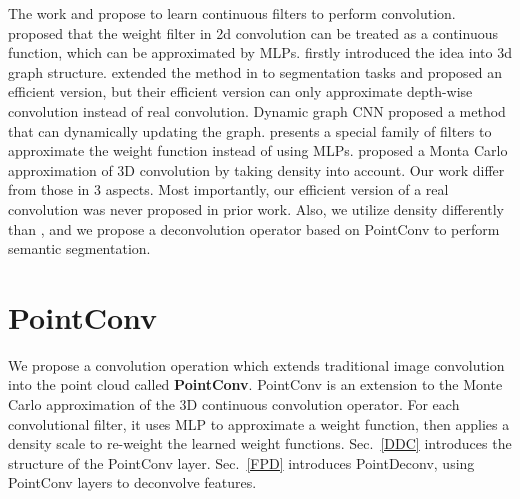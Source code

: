 \documentclass[10pt,twocolumn,letterpaper]{article}
\begin{document}
The work \cite{simonovsky2017dynamic,jia2016dynamic, wang2018dynamic, hermosilla2018monte, wang2018deep} and \cite{xu2018spidercnn} propose to learn continuous filters to perform convolution. \cite{jia2016dynamic} proposed that the weight filter in 2d convolution can be treated as a continuous function, which can be approximated by MLPs. \cite{simonovsky2017dynamic} firstly introduced the idea into 3d graph structure. \cite{wang2018deep} extended the method in \cite{simonovsky2017dynamic} to segmentation tasks and proposed an efficient version, but their efficient version can only approximate depth-wise convolution instead of real convolution. Dynamic graph CNN \cite{wang2018dynamic} proposed a method that can dynamically updating the graph. \cite{xu2018spidercnn} presents a special family of filters to approximate the weight function instead of using MLPs. \cite{hermosilla2018monte} proposed a Monta Carlo approximation of 3D convolution by taking density into account. Our work differ from those in 3 aspects. Most importantly, our efficient version of a real convolution was never proposed in prior work. Also, we utilize density differently than \cite{hermosilla2018monte}, and we propose a deconvolution operator based on PointConv to perform semantic segmentation.

\begin{comment}
PointCNN \cite{li2018pointcnn} is proposed as another approach to perform convolution on point clouds. The idea in PointCNN \cite{li2018pointcnn} is to learn a transformation from the input points and then use it to simultaneously weight and permute the input features associated with the points. For a local region with  points, a transformation \cite{li2018pointcnn} is a  matrix learned from the coordinates of  input points with multi-layer percetrons. Comparing to our approach, PointCNN is unable to achieve permutation-invariance, which is desired for point clouds.
\end{comment}

\section{PointConv}
We propose a convolution operation which extends traditional image convolution into the point cloud called \textbf{PointConv}. PointConv is an extension to the Monte Carlo approximation of the 3D continuous convolution operator. For each convolutional filter, it uses MLP to approximate a weight function, then applies a density scale to re-weight the learned weight functions. Sec.~\ref{DDC} introduces the structure of the PointConv layer. Sec.~\ref{FPD} introduces PointDeconv, using PointConv layers to deconvolve features.
\end{document}
